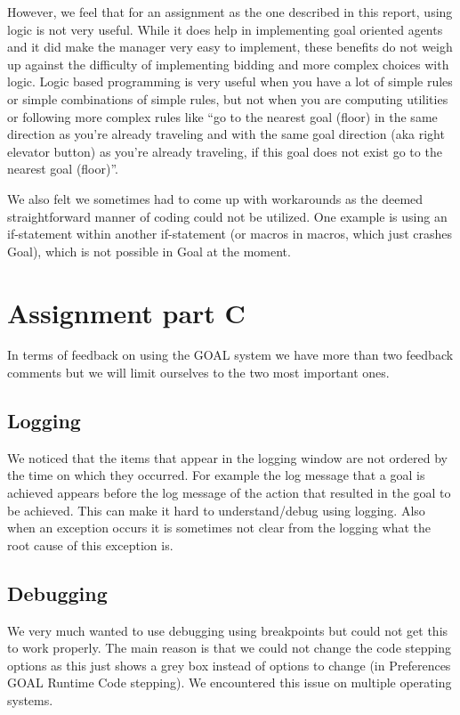 \documentclass[a4paper,11pt]{article}
\begin{document}
However, we feel that for an assignment as the one described in this report, using logic is not very useful. While it does help in implementing goal oriented agents and it did make the manager very easy to implement, these benefits do not weigh up against the difficulty of implementing bidding and more complex choices with logic. Logic based programming is very useful when you have a lot of simple rules or simple combinations of simple rules, but not when you are computing utilities or following more complex rules like ``go to the nearest goal (floor) in the same direction as you're already traveling and with the same goal direction (aka right elevator button) as you're already traveling, if this goal does not exist go to the nearest goal (floor)''.

We also felt we sometimes had to come up with workarounds as the deemed straightforward manner of coding could not be utilized. One example is using an if-statement within another if-statement (or macros in macros, which just crashes Goal), which is not possible in Goal at the moment. 

\section{Assignment part C}
In terms of feedback on using the GOAL system we have more than two feedback comments but we will limit ourselves to the two most important ones. 

\subsection{Logging}
We noticed that the items that appear in the logging window are not ordered by the time on which they occurred. For example the log message that a goal is achieved appears before the log message of the action that resulted in the goal to be achieved. This can make it hard to understand/debug using logging. Also when an exception occurs it is sometimes not clear from the logging what the root cause of this exception is.

\subsection{Debugging}
We very much wanted to use debugging using breakpoints but could not get this to work properly. The main reason is that we could not change the code stepping options as this just shows a grey box instead of options to change (in Preferences \textrightarrow GOAL \textrightarrow Runtime \textrightarrow Code stepping). We encountered this issue on multiple operating systems. 
\end{document}
